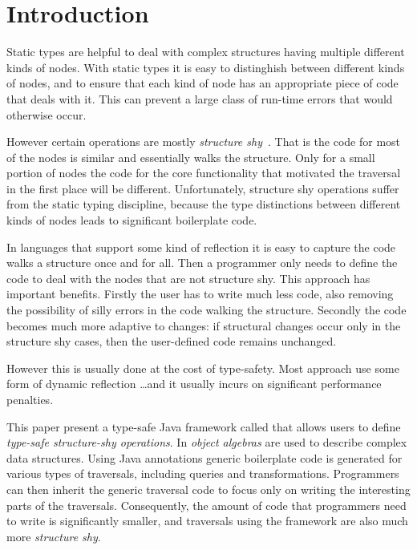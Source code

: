 \section{Introduction}

Static types are helpful to deal with complex structures having
multiple different kinds of nodes. With static types it is easy to
distinghish between different kinds of nodes, and to ensure that each
kind of node has an appropriate piece of code that deals with it. This
can prevent a large class of run-time errors that would otherwise
occur. 


However certain operations are mostly \emph{structure
  shy}~\cite{}. That is the code for most of the nodes is similar and
essentially walks the structure.  Only for a small portion of nodes
the code for the core functionality that motivated the
traversal in the first place will be different.  Unfortunately,
structure shy operations suffer from the static typing discipline,
because the type distinctions between different kinds of nodes leads
to significant boilerplate code.

In languages that support some kind of reflection it is easy to
capture the code walks a structure once and for all. Then a programmer
only needs to define the code to deal with the nodes that are not
structure shy. This approach has important benefits. Firstly the user
has to write much less code, also removing the possibility of silly
errors in the code walking the structure. Secondly the code becomes
much more adaptive to changes: if structural changes occur only in the
structure shy cases, then the user-defined code remains unchanged.

However this is usually done at the cost of type-safety.  Most
approach use some form of dynamic reflection \ldots and it usually
incurs on significant performance penalties. 

This paper present a type-safe Java framework called \name that allows
users to define \emph{type-safe structure-shy operations}.  In \name
\emph{object algebras} are used to describe complex data
structures. Using Java annotations generic boilerplate code is
generated for various types of traversals, including queries and
transformations. Programmers can then inherit the generic traversal
code to focus only on writing the interesting parts of the
traversals. Consequently, the amount of code that programmers need to
write is significantly smaller, and traversals using the \name
framework are also much more \emph{structure shy}.

